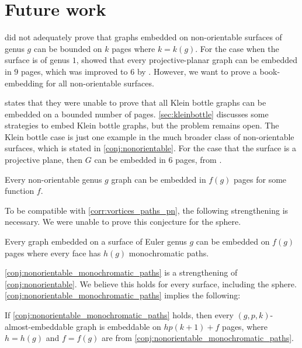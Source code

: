 
\section{Future work}

\textcite{heathPagenumberGenusGraphs1992} did not adequately prove that graphs embedded on non-orientable surfaces of genus $g$ can be bounded on $k$ pages where $k = k(g)$. For the case when the surface is of genus $1$, \textcite{nakamotoBookEmbeddingProjectiveplanar2015} showed that every projective-planar graph can be embedded in $9$ pages, which was improved to 6 by \textcite{ozekiBookEmbeddingGraphs2019}. However, we want to prove a book-embedding for all non-orientable surfaces. 

\textcite{ozekiBookEmbeddingGraphs2019} states that they were unable to prove that all Klein bottle graphs can be embedded on a bounded number of pages. \cref{sec:kleinbottle} discusses some strategies to embed Klein bottle graphs, but the problem remains open. The Klein bottle case is just one example in the much broader class of non-orientable surfaces, which is stated in \cref{conj:nonorientable}. For the case that the surface is a projective plane, then $G$ can be embedded in 6 pages, from \textcite{ozekiBookEmbeddingGraphs2019}. 

\begin{conjecture}\label{conj:nonorientable}
	Every non-orientable genus $g$ graph can be embedded in $f(g)$ pages for some function $f$. 
\end{conjecture}

To be compatible with \cref{corr:vortices_paths_pn}, the following strengthening is necessary. We were unable to prove this conjecture for the sphere.

\begin{conjecture}\label{conj:nonorientable_monochromatic_paths}
	Every graph embedded on a surface of Euler genus $g$ can be embedded on $f(g)$ pages where every face has $h(g)$ monochromatic paths. 
\end{conjecture}

\cref{conj:nonorientable_monochromatic_paths} is a strengthening of \cref{conj:nonorientable}. We believe this holds for every surface, including the sphere.
\cref{conj:nonorientable_monochromatic_paths} implies the following:

\begin{corollary}\label{corr:aegraphs}
	If \cref{conj:nonorientable_monochromatic_paths} holds, then every $(g, p, k)$-almost-embeddable graph is embeddable on $h p (k + 1) + f$ pages, where $h = h(g)$ and $f = f(g)$ are from \cref{conj:nonorientable_monochromatic_paths}.
\end{corollary}

